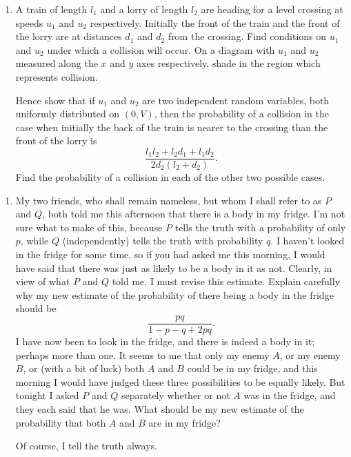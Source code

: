 \documentclass[a4, 11pt]{report}
\newlength{\qspace}
\newcounter{qnumber}
\newenvironment{question}%
 {\vspace{\qspace}
  \begin{enumerate}[\bfseries 1\quad][10]%
    \setcounter{enumi}{\value{qnumber}}%
    \item%
 }
{
  \end{enumerate}
  \filbreak
  \stepcounter{qnumber}
 }
\begin{document}
\begin{question}
A train of length $l_{1}$ and a lorry of length $l_{2}$ are heading
for a level crossing at speeds $u_{1}$ and $u_{2}$ respectively.
Initially the front of the train and the front of the lorry are at
distances $d_{1}$ and $d_{2}$ from the crossing. Find conditions
on $u_{1}$ and $u_{2}$ under which a collision will occur. On a
diagram with $u_{1}$ and $u_{2}$ measured along the $x$ and $y$
axes respectively, shade in the region which represents collision. 


Hence show that if $u_{1}$ and $u_{2}$ are two independent random
variables, both uniformly distributed on $(0,V)$, then the probability
of a collision in the case when initially the back of the train is
nearer to the crossing than the front of the lorry is 
\[
\frac{l_{1}l_{2}+l_{2}d_{1}+l_{1}d_{2}}{2d_{2}\left(l_{2}+d_{2}\right)}.
\]
Find the probability of a collision in each of the other two possible
cases. 
\end{question}

\begin{question}
My two friends, who shall remain nameless, but whom I shall refer
to as $P$ and $Q$, both told me this afternoon that there is a body
in my fridge. I'm not sure what to make of this, because $P$ tells
the truth with a probability of only $p$, while $Q$ (independently)
tells the truth with probability $q$. I haven't looked in the fridge
for some time, so if you had asked me this morning, I would have said
that there was just as likely to be a body in it as not. Clearly,
in view of what $P$ and $Q$ told me, I must revise this estimate.
Explain carefully why my new estimate of the probability of there
being a body in the fridge should be 
\[
\frac{pq}{1-p-q+2pq}.
\]
I have now been to look in the fridge, and there is indeed a body
in it; perhaps more than one. It seems to me that only my enemy $A$,
or my enemy $B$, or (with a bit of luck) both $A$ and $B$ could
be in my fridge, and this morning I would have judged these three
possibilities to be equally likely. But tonight I asked $P$ and $Q$
separately whether or not $A$ was in the fridge, and they each said
that he was. What should be my new estimate of the probability that
both $A$ and $B$ are in my fridge?


Of course, I tell the truth always.
\end{question}
\end{document}
